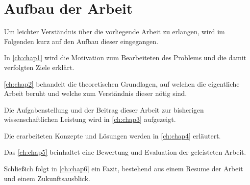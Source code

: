 \section{Aufbau der Arbeit}
Um leichter Verständnis über die vorliegende Arbeit zu erlangen, wird im Folgenden kurz auf den Aufbau dieser eingegangen.

In \autoref{ch:chap1} wird die Motivation zum Bearbeiteten des Problems und die damit verfolgten Ziele erklärt. 

\autoref{ch:chap2} behandelt die theoretischen Grundlagen, auf welchen die eigentliche Arbeit beruht und welche zum Verständnis dieser nötig sind.

Die Aufgabenstellung und der Beitrag dieser Arbeit zur bisherigen wissenschaftlichen Leistung wird in \autoref{ch:chap3} aufgezeigt.

Die erarbeiteten Konzepte und Lösungen werden in \autoref{ch:chap4} erläutert.

Das \autoref{ch:chap5} beinhaltet eine Bewertung und Evaluation der geleisteten Arbeit.

Schließich folgt in \autoref{ch:chap6} ein Fazit, bestehend aus einem Resume der Arbeit und einem Zukunftsausblick.